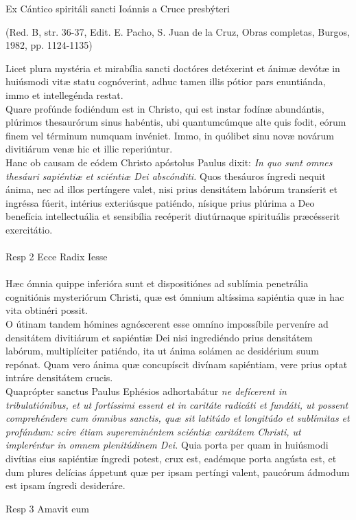 \documentclass[options]{article}
\begin{document}
	Ex Cántico spiritáli sancti Ioánnis a Cruce presbýteri 
	\begin{flushright}
		(Red. B, str. 36-37, Edit. E. Pacho, S. Juan de la Cruz, Obras completas, Burgos, 1982, pp. 1124-1135)	
	\end{flushright}
	Licet plura mystéria et mirabília sancti doctóres detéxerint et ánimæ devótæ in huiúsmodi vitæ statu cognóverint, adhuc tamen illis pótior pars enuntiánda, immo et intellegénda restat.\\
	Quare profúnde fodiéndum est in Christo, qui est instar fodínæ abundántis, plúrimos thesaurórum sinus habéntis, ubi quantumcúmque alte quis fodit, eórum finem vel términum numquam invéniet. Immo, in quólibet sinu novæ novárum divitiárum venæ hic et illic reperiúntur.\\
	Hanc ob causam de eódem Christo apóstolus Paulus dixit: \emph{In quo sunt omnes thesáuri sapiéntiæ et sciéntiæ Dei abscónditi.} Quos thesáuros íngredi nequit ánima, nec ad illos pertíngere valet, nisi prius densitátem labórum transíerit et ingréssa fúerit, intérius exteriúsque patiéndo, nísique prius plúrima a Deo benefícia intellectuália et sensibília recéperit diutúrnaque spirituális præcésserit exercitátio.\\
	\\
	Resp 2  Ecce Radix Iesse\\
	\\
	Hæc ómnia quippe inferióra sunt et dispositiónes ad sublímia penetrália cognitiónis mysteriórum Christi, quæ est ómnium altíssima sapiéntia quæ in hac vita obtinéri possit.\\
	O útinam tandem hómines agnóscerent esse omníno impossíbile perveníre ad densitátem divitiárum et sapiéntiæ Dei nisi ingrediéndo prius densitátem labórum, multiplíciter patiéndo, ita ut ánima solámen ac desidérium suum repónat. Quam vero ánima quæ concupíscit divínam sapiéntiam, vere prius optat intráre densitátem crucis.\\
	Quaprópter sanctus Paulus Ephésios adhortabátur \emph{ne defícerent in tribulatiónibus, et ut fortíssimi essent et in caritáte radicáti et fundáti, ut possent comprehéndere cum ómnibus sanctis, quæ sit latitúdo et longitúdo et sublímitas et profúndum: scire étiam supereminéntem sciéntiæ caritátem Christi, ut impleréntur in omnem plenitúdinem Dei.}
	Quia porta per quam in huiúsmodi divítias eius sapiéntiæ íngredi potest, crux est, eadémque porta angústa est, et dum plures delícias áppetunt quæ per ipsam pertíngi valent, paucórum ádmodum est ipsam íngredi desideráre.
	
	Resp 3 Amavit eum
	
\end{document}

